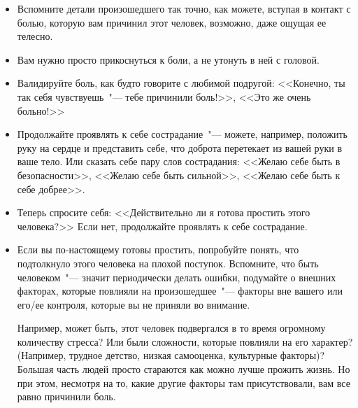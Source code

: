 \vspace{3ex}


\begin{itemize}
	\item Вспомните детали произошедшего так точно, как можете, вступая в контакт с болью, которую вам причинил этот человек, возможно, даже ощущая ее телесно.
	
	\item Вам нужно просто прикоснуться к боли, а не утонуть в ней с головой.
\end{itemize}

\vspace{3ex}


\begin{itemize}
	\item Валидируйте боль, как будто говорите с любимой подругой: <<Конечно, ты так себя чувствуешь~"--- тебе причинили боль!>>, <<Это же очень больно!>>
	
	\item Продолжайте проявлять к себе сострадание~"--- можете, например, положить руку на сердце и представить себе, что доброта перетекает из вашей руки в ваше тело. Или сказать себе пару слов сострадания: <<Желаю себе быть в безопасности>>, <<Желаю себе быть сильной>>, <<Желаю себе быть к себе добрее>>.
	
	\item Теперь спросите себя: <<Действительно ли я готова простить этого человека?>> Если нет, продолжайте проявлять к себе сострадание.
\end{itemize}
 
\vspace{3ex}


\begin{itemize}
	\item Если вы по-настоящему готовы простить, попробуйте понять, что подтолкнуло этого человека на плохой поступок. Вспомните, что быть человеком~"--- значит периодически делать ошибки, подумайте о внешних факторах, которые повлияли на произошедшее~"--- факторы вне вашего или его/ее контроля, которые вы не приняли во внимание. 

	Например, может быть, этот человек подвергался в то время огромному количеству стресса? Или были сложности, которые повлияли на его характер? (Например, трудное детство, низкая самооценка, культурные факторы)? Большая часть людей просто стараются как можно лучше прожить жизнь. Но при этом, несмотря на то, какие другие факторы там присутствовали, вам все равно причинили боль.
\end{itemize}
	
